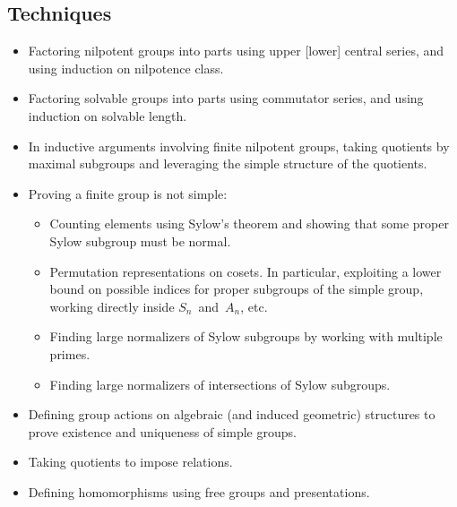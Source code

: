 \subsection*{Techniques}
\begin{itemize}[itemsep=0pt]
\item Factoring nilpotent groups into parts using upper [lower] central series, and using induction on nilpotence class.
\item Factoring solvable groups into parts using commutator series, and using induction on solvable length.
\item In inductive arguments involving finite nilpotent groups, taking quotients by maximal subgroups and leveraging the simple structure of the quotients.
\item Proving a finite group is not simple:
\begin{itemize}[itemsep=0pt]
\item Counting elements using Sylow's theorem and showing that some proper Sylow subgroup must be normal.
\item Permutation representations on cosets. In particular, exploiting a lower bound on possible indices for proper subgroups of the simple group, working directly inside \(S_n\)~and~\(A_n\), etc.
\item Finding large normalizers of Sylow subgroups by working with multiple primes.
\item Finding large normalizers of intersections of Sylow subgroups.
\end{itemize}
\item Defining group actions on algebraic (and induced geometric) structures to prove existence and uniqueness of simple groups.
\item Taking quotients to impose relations.
\item Defining homomorphisms using free groups and presentations.
\end{itemize}
